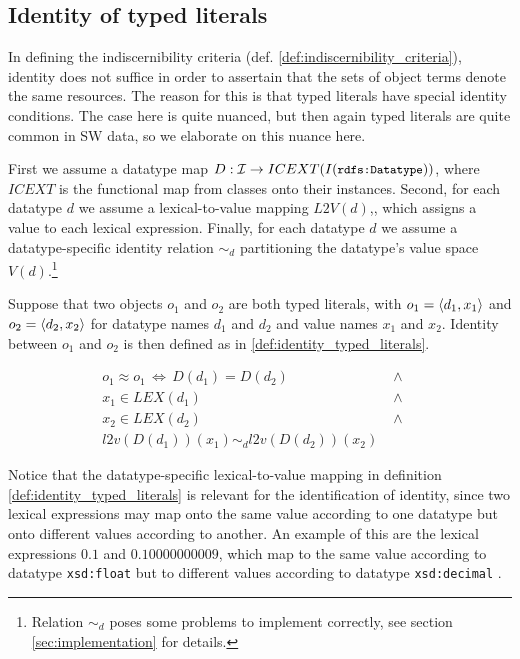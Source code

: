 \subsection{Identity of typed literals}

In defining the indiscernibility criteria
  (def. \ref{def:indiscernibility_criteria}),
  identity does not suffice in order to assertain that
  the sets of object terms denote the same resources.
The reason for this is that typed literals have special identity conditions.
The case here is quite nuanced,
  but then again typed literals are quite common in SW data,
  so we elaborate on this nuance here.

First we assume a datatype map
  \mbox{$D : \mathcal{I} \rightarrow ICEXT(I({\small \texttt{rdfs:Datatype}}))$},
  where $ICEXT$ is the functional map from classes onto their instances.
Second, for each datatype $d$ we assume a lexical-to-value mapping
  $L2V(d)$,\cite{Hayes2004},
  which assigns a value to each lexical expression.
Finally, for each datatype $d$ we assume a datatype-specific identity relation
  $\sim_d$ partitioning the datatype's value space $V(d)$.\footnote{
    Relation $\sim_d$ poses some problems to implement correctly,
      see section \ref{sec:implementation} for details.
    }

Suppose that two objects $o_1$ and $o_2$ are both typed literals,
  with $o_1 = \langle d_1,x_1\rangle$ and $o_2 = \langle d_2,x_2\rangle$
  for datatype names $d_1$ and $d_2$ and value names $x_1$ and $x_2$.
Identity between $o_1$ and $o_2$ is then defined as in
  \ref{def:identity_typed_literals}.

\begin{definition}
\label{def:identity_typed_literals}
\begin{align}
  o_1 \approx o_1
\,\iff\,
    D(d_1) = D(d_2)
  & \; \land \; &\nonumber\\
    x_1 \in LEX(d_1)
  & \; \land \; &\nonumber\\
    x_2 \in LEX(d_2)
  & \; \land \; &\nonumber\\
    l2v(D(d_1))(x_1) \sim_d l2v(D(d_2))(x_2)\nonumber
\end{align}
\end{definition}

\noindent Notice that the datatype-specific lexical-to-value mapping
  in definition \ref{def:identity_typed_literals} is relevant for
  the identification of identity,
  since two lexical expressions may map onto the same value
  according to one datatype but onto different values
  according to another.
An example of this are the lexical expressions $0.1$ and $0.10000000009$,
  which map to the same value according to datatype
  {\small \texttt{xsd:float}}
  but to different values according to datatype
  {\small \texttt{xsd:decimal}} \cite{Goldberg1991}.

